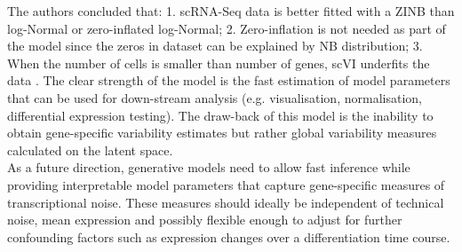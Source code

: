 The authors concluded that: 
1. scRNA-Seq data is better fitted with a ZINB than log-Normal or zero-inflated log-Normal; 2. Zero-inflation is not needed as part of the model since the zeros in dataset can be explained by NB distribution; 
3. When the number of cells is smaller than number of genes, scVI underfits the data \citep{Lopez2018}. 
The clear strength of the model is the fast estimation of model parameters that can be used for down-stream analysis (e.g. visualisation, normalisation, differential expression testing). 
The draw-back of this model is the inability to obtain gene-specific variability estimates but rather global variability measures calculated on the latent space. \\

As a future direction, generative models need to allow fast inference while providing interpretable model parameters that capture gene-specific measures of transcriptional noise. 
These measures should ideally be independent of technical noise, mean expression and possibly flexible enough to adjust for further confounding factors such as expression changes over a differentiation time course. 
 

